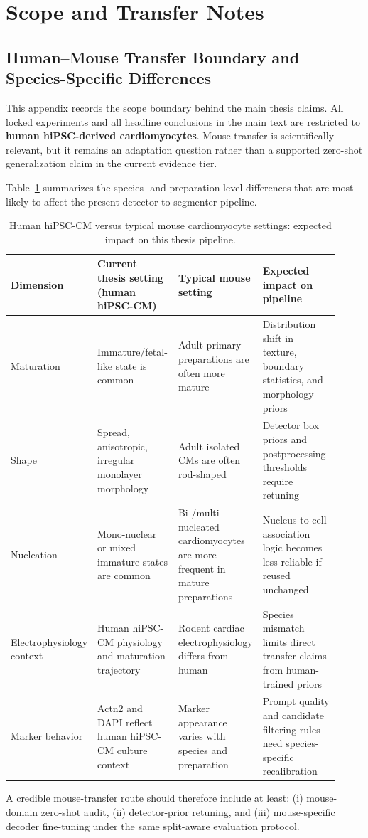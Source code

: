 \section{Scope and Transfer Notes}\label{scope-and-transfer-notes}

\subsection{Human--Mouse Transfer Boundary and Species-Specific Differences}\label{appendix-human-mouse-transfer-boundary}

This appendix records the scope boundary behind the main thesis claims. All locked experiments and all headline conclusions in the main text are restricted to \textbf{human hiPSC-derived cardiomyocytes}. Mouse transfer is scientifically relevant, but it remains an adaptation question rather than a supported zero-shot generalization claim in the current evidence tier.

Table~\ref{tab:human_mouse_gap} summarizes the species- and preparation-level differences that are most likely to affect the present detector-to-segmenter pipeline.

\begin{table}[htbp]
\centering
\small
\caption{Human hiPSC-CM versus typical mouse cardiomyocyte settings: expected impact on this thesis pipeline.}
\label{tab:human_mouse_gap}
\begin{tabular}{p{0.16\linewidth}p{0.25\linewidth}p{0.25\linewidth}p{0.26\linewidth}}
\toprule
Dimension & Current thesis setting (human hiPSC-CM) & Typical mouse setting & Expected impact on pipeline \\
\midrule
Maturation & Immature/fetal-like state is common & Adult primary preparations are often more mature & Distribution shift in texture, boundary statistics, and morphology priors \\
Shape & Spread, anisotropic, irregular monolayer morphology & Adult isolated CMs are often rod-shaped \cite{li2014isolation_mouse_cm} & Detector box priors and postprocessing thresholds require retuning \\
Nucleation & Mono-nuclear or mixed immature states are common & Bi-/multi-nucleated cardiomyocytes are more frequent in mature preparations \cite{ahmed2020hipscm_maturation} & Nucleus-to-cell association logic becomes less reliable if reused unchanged \\
Electrophysiology context & Human hiPSC-CM physiology and maturation trajectory & Rodent cardiac electrophysiology differs from human \cite{joukar2021rodent_human_ecg} & Species mismatch limits direct transfer claims from human-trained priors \\
Marker behavior & Actn2 and DAPI reflect human hiPSC-CM culture context & Marker appearance varies with species and preparation & Prompt quality and candidate filtering rules need species-specific recalibration \\
\bottomrule
\end{tabular}
\end{table}

A credible mouse-transfer route should therefore include at least: (i) mouse-domain zero-shot audit, (ii) detector-prior retuning, and (iii) mouse-specific decoder fine-tuning under the same split-aware evaluation protocol.
